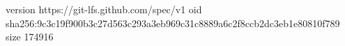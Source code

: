 version https://git-lfs.github.com/spec/v1
oid sha256:9c3c19f900b3c27d563c293a3eb969c31c8889a6c2f8ccb2dc3eb1e80810f789
size 174916
